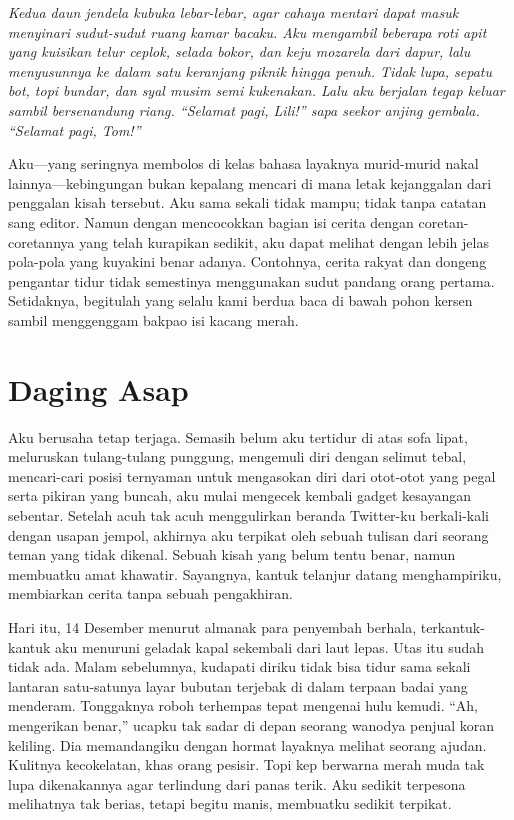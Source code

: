 \documentclass[smalldemyvopaper,11pt,twoside,onecolumn,openright,extrafontsizes]{memoir}
\begin{document}
\textit{Kedua daun jendela kubuka lebar-lebar, agar cahaya mentari dapat masuk menyinari sudut-sudut ruang kamar bacaku. Aku mengambil beberapa roti apit yang kuisikan telur ceplok, selada bokor, dan keju mozarela dari dapur, lalu menyusunnya ke dalam satu keranjang piknik hingga penuh. Tidak lupa, sepatu bot, topi bundar, dan syal musim semi kukenakan. Lalu aku berjalan tegap keluar sambil bersenandung riang. ``Selamat pagi, Lili!'' sapa seekor anjing gembala. ``Selamat pagi, Tom!''}


Aku---yang seringnya membolos di kelas bahasa layaknya murid-murid nakal lainnya---kebingungan bukan kepalang mencari di mana letak kejanggalan dari penggalan kisah tersebut. Aku sama sekali tidak mampu; tidak tanpa catatan sang editor. Namun dengan mencocokkan bagian isi cerita dengan coretan-coretannya yang telah kurapikan sedikit, aku dapat melihat dengan lebih jelas pola-pola yang kuyakini benar adanya. Contohnya, cerita rakyat dan dongeng pengantar tidur tidak semestinya menggunakan sudut pandang orang pertama. Setidaknya, begitulah yang selalu kami berdua baca di bawah pohon kersen sambil menggenggam bakpao isi kacang merah.

\chapter{Daging Asap}

Aku berusaha tetap terjaga. Semasih belum aku tertidur di atas sofa lipat, meluruskan tulang-tulang punggung, mengemuli diri dengan selimut tebal, mencari-cari posisi ternyaman untuk mengasokan diri dari otot-otot yang pegal serta pikiran yang buncah, aku mulai mengecek kembali gadget kesayangan sebentar. Setelah acuh tak acuh menggulirkan beranda Twitter-ku berkali-kali dengan usapan jempol, akhirnya aku terpikat oleh sebuah tulisan dari seorang teman yang tidak dikenal. Sebuah kisah yang belum tentu benar, namun membuatku amat khawatir. Sayangnya, kantuk telanjur datang menghampiriku, membiarkan cerita tanpa sebuah pengakhiran.


Hari itu, 14 Desember menurut almanak para penyembah berhala, terkantuk-kantuk aku menuruni geladak kapal sekembali dari laut lepas. Utas itu sudah tidak ada. Malam sebelumnya, kudapati diriku tidak bisa tidur sama sekali lantaran satu-satunya layar bubutan terjebak di dalam terpaan badai yang menderam. Tonggaknya roboh terhempas tepat mengenai hulu kemudi. ``Ah, mengerikan benar,'' ucapku tak sadar di depan seorang wanodya penjual koran keliling. Dia memandangiku dengan hormat layaknya melihat seorang ajudan. Kulitnya kecokelatan, khas orang pesisir. Topi kep berwarna merah muda tak lupa dikenakannya agar terlindung dari panas terik. Aku sedikit terpesona melihatnya tak berias, tetapi begitu manis, membuatku sedikit terpikat.
\end{document}
